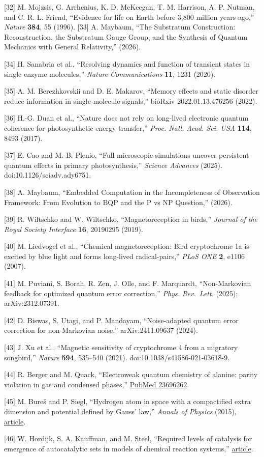 \documentclass[
]{article}
\begin{document}
{[}32{]} M. Mojzsis, G. Arrhenius, K. D. McKeegan, T. M. Harrison, A. P.
Nutman, and C. R. L. Friend, ``Evidence for life on Earth before 3,800
million years ago,'' \emph{Nature} \textbf{384}, 55 (1996). {[}33{]} A.
Maybaum, ``The Substratum Construction: Reconstruction, the Substratum
Gauge Group, and the Synthesis of Quantum Mechanics with General
Relativity,'' (2026).

{[}34{]} H. Sanabria et al., ``Resolving dynamics and function of
transient states in single enzyme molecules,'' \emph{Nature
Communications} \textbf{11}, 1231 (2020).

{[}35{]} A. M. Berezhkovskii and D. E. Makarov, ``Memory effects and
static disorder reduce information in single-molecule signals,'' bioRxiv
2022.01.13.476256 (2022).

{[}36{]} H.-G. Duan et al., ``Nature does not rely on long-lived
electronic quantum coherence for photosynthetic energy transfer,''
\emph{Proc. Natl. Acad. Sci. USA} \textbf{114}, 8493 (2017).

{[}37{]} E. Cao and M. B. Plenio, ``Full microscopic simulations uncover
persistent quantum effects in primary photosynthesis,'' \emph{Science
Advances} (2025). doi:10.1126/sciadv.ady6751.

{[}38{]} A. Maybaum, ``Embedded Computation in the Incompleteness of
Observation Framework: From Evolution to BQP and the P vs NP Question,''
(2026).

{[}39{]} R. Wiltschko and W. Wiltschko, ``Magnetoreception in birds,''
\emph{Journal of the Royal Society Interface} \textbf{16}, 20190295
(2019).

{[}40{]} M. Liedvogel et al., ``Chemical magnetoreception: Bird
cryptochrome 1a is excited by blue light and forms long-lived
radical-pairs,'' \emph{PLoS ONE} \textbf{2}, e1106 (2007).

{[}41{]} M. Puviani, S. Borah, R. Zen, J. Olle, and F. Marquardt,
``Non-Markovian feedback for optimized quantum error correction,''
\emph{Phys. Rev.~Lett.} (2025); arXiv:2312.07391.

{[}42{]} D. Biswas, S. Utagi, and P. Mandayam, ``Noise-adapted quantum
error correction for non-Markovian noise,'' arXiv:2411.09637 (2024).

{[}43{]} J. Xu et al., ``Magnetic sensitivity of cryptochrome 4 from a
migratory songbird,'' \emph{Nature} \textbf{594}, 535--540 (2021).
doi:10.1038/s41586-021-03618-9.

{[}44{]} R. Berger and M. Quack, ``Electroweak quantum chemistry of
alanine: parity violation in gas and condensed phases,''
\href{https://pubmed.ncbi.nlm.nih.gov/23696262/}{PubMed 23696262}.

{[}45{]} M. Bureš and P. Siegl, ``Hydrogen atom in space with a
compactified extra dimension and potential defined by Gauss' law,''
\emph{Annals of Physics} (2015),
\href{https://www.sciencedirect.com/science/article/abs/pii/S0003491615003681}{article}.

{[}46{]} W. Hordijk, S. A. Kauffman, and M. Steel, ``Required levels of
catalysis for emergence of autocatalytic sets in models of chemical
reaction systems,''
\href{https://www.math.canterbury.ac.nz/~m.steel/Non_UC/files/research/hordijk_kauffman_steel.pdf}{article}.
\end{document}
